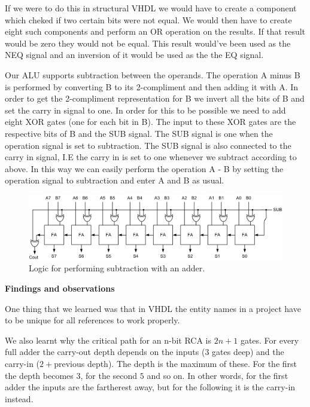 \documentclass[a4paper,11pt]{article}
\begin{document}
If we were to do this in structural VHDL we would have to create a component which cheked if two certain bits were not equal. We would then have to create eight such components and perform an OR operation on the results. If that result would be zero they would not be equal. This result would've been used as the NEQ signal and an inversion of it would be used as the the EQ signal. 

Our ALU supports subtraction between the operands. The operation A minus B is performed by converting B to its 2-compliment and then adding it with A. In order to get the 2-compliment representation for B we invert all the bits of B and set the carry in signal to one. In order for this to be possible we need to add eight XOR gates (one for each bit in B). The input to these XOR gates are the respective bits of B and the SUB signal. The SUB signal is one when the operation signal is set to subtraction. The SUB signal is also connected to the carry in signal, I.E the carry in is set to one whenever we subtract according to above. In this way we can easily perform the operation A - B by setting the operation signal to subtraction and enter A and B as usual.

\begin{figure}[h!]
  \includegraphics[width=\linewidth]{subtractionlogic.jpg}
  \caption{Logic for performing subtraction with an adder.}
  \label{fig:etikett}
\end{figure}

\noindent
\textbf{Findings and observations}

One thing that we learned was that in VHDL the entity names in a project have to be unique for all references to work properly. 

We also learnt why the critical path for an n-bit RCA is $2n+1$ gates. For every full adder the carry-out depth depends on the inputs ($3$ gates deep) and the carry-in ($2 + $previous depth). The depth is the maximum of these. For the first the depth becomes $3$, for the second $5$ and so on. In other words, for the first adder the inputs are the fartherest away, but for the following it is the carry-in instead. 
\end{document}
